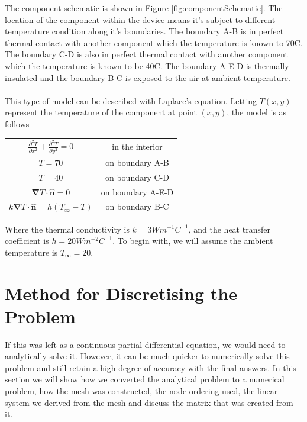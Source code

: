 \documentclass[12pt,a4paper]{article}
\begin{document}
The component schematic is shown in Figure \ref{fig:componentSchematic}. The location of the component within the device means it's subject to different temperature condition along it's boundaries. The boundary A-B is in perfect thermal contact with another component which the temperature is known to 70\degree C. The boundary C-D is also in perfect thermal contact with another component which the temperature is known to be 40\degree C. The boundary A-E-D is thermally insulated and the boundary B-C is exposed to the air at ambient temperature.
\\\\
This type of model can be described with Laplace's equation. Letting $T(x,y)$ represent the temperature of the component at point $(x, y)$, the model is as follows	

\begin{center}
\begin{tabular}{c c}
$\frac{\partial^2 T}{\partial x^2}+\frac{\partial^2 T}{\partial y^2}=0$ & in the interior\\
$T = 70$ & on boundary A-B \\
$T = 40$ & on boundary C-D \\
$\boldsymbol{\nabla} T \cdot {\hat{\textbf{n}}} = 0$ & on boundary A-E-D\\
$k\boldsymbol{\nabla}T\cdot\hat{\textbf{n}} = h(T_{\infty} - T)$ & on boundary B-C
\end{tabular}
\end{center}
Where the thermal conductivity is $k=3Wm^{-1}C^{-1}$, and the heat transfer coefficient is $h=20 Wm^{-2}C^{-1}$. To begin with, we will assume the ambient temperature is $T_\infty = 20$.
\clearpage
\section{Method for Discretising the Problem}
If this was left as a continuous partial differential equation, we would need to analytically solve it. However, it can be much quicker to numerically solve this problem and still retain a high degree of accuracy with the final answers. In this section we will show how we converted the analytical problem to a numerical problem, how the mesh was constructed, the node ordering used, the linear system we derived from the mesh and discuss the matrix that was created from it.
\end{document}
